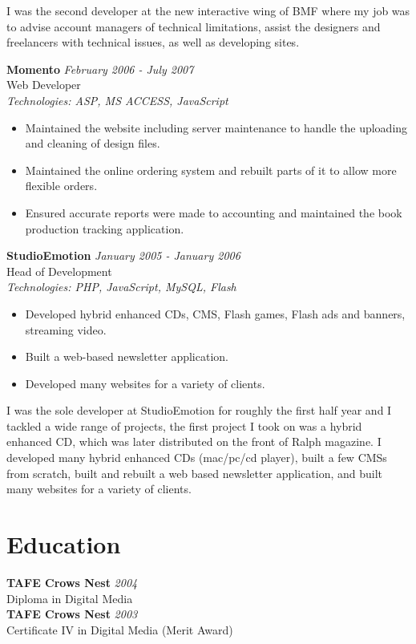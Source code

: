 \documentclass[a4paper,10pt]{article}
\begin{document}
I was the second developer at the new interactive wing of BMF where my job was to advise account managers of 
technical limitations, assist the designers and freelancers with technical issues, as well as developing sites.

\vspace{1em}

\textbf{Momento} \hfill \textit{February 2006 - July 2007} \\
Web Developer \\
\textit{Technologies: ASP, MS ACCESS, JavaScript}
\begin{itemize}
    \item Maintained the website including server maintenance to handle the uploading and cleaning of design files.
    \item Maintained the online ordering system and rebuilt parts of it to allow more flexible orders.
    \item Ensured accurate reports were made to accounting and maintained the book production tracking application.
\end{itemize}

\vspace{1em}

\textbf{StudioEmotion} \hfill \textit{January 2005 - January 2006} \\
Head of Development \\
\textit{Technologies: PHP, JavaScript, MySQL, Flash}
\begin{itemize}
    \item Developed hybrid enhanced CDs, CMS, Flash games, Flash ads and banners, streaming video.
    \item Built a web-based newsletter application.
    \item Developed many websites for a variety of clients.
\end{itemize}

I was the sole developer at StudioEmotion for roughly the first half year and I tackled a wide range of projects, the first 
project I took on was a hybrid enhanced CD, which was later distributed on the front of Ralph magazine.
I developed many hybrid enhanced CDs (mac/pc/cd player), built a few CMSs from scratch, built and rebuilt a web 
based newsletter application, and built many websites for a variety of clients.

\section*{Education}

\textbf{TAFE Crows Nest} \hfill \textit{2004} \\
Diploma in Digital Media \\
\textbf{TAFE Crows Nest} \hfill \textit{2003} \\
Certificate IV in Digital Media (Merit Award)
\end{document}
